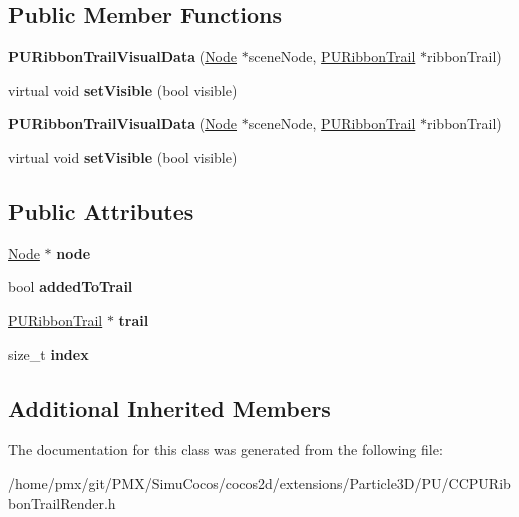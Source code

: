 \subsection*{Public Member Functions}
\begin{DoxyCompactItemize}
\item 
\mbox{\label{classPURibbonTrailVisualData_af4a8bd2be2968bc0cba828350ffb73f1}} 
{\bfseries P\+U\+Ribbon\+Trail\+Visual\+Data} (\hyperlink{classNode}{Node} $\ast$scene\+Node, \hyperlink{classPURibbonTrail}{P\+U\+Ribbon\+Trail} $\ast$ribbon\+Trail)
\item 
\mbox{\label{classPURibbonTrailVisualData_ace701631c7441bd764ae84b457c73a03}} 
virtual void {\bfseries set\+Visible} (bool visible)
\item 
\mbox{\label{classPURibbonTrailVisualData_af4a8bd2be2968bc0cba828350ffb73f1}} 
{\bfseries P\+U\+Ribbon\+Trail\+Visual\+Data} (\hyperlink{classNode}{Node} $\ast$scene\+Node, \hyperlink{classPURibbonTrail}{P\+U\+Ribbon\+Trail} $\ast$ribbon\+Trail)
\item 
\mbox{\label{classPURibbonTrailVisualData_ace701631c7441bd764ae84b457c73a03}} 
virtual void {\bfseries set\+Visible} (bool visible)
\end{DoxyCompactItemize}
\subsection*{Public Attributes}
\begin{DoxyCompactItemize}
\item 
\mbox{\label{classPURibbonTrailVisualData_a9c34388cf672f054e02776b0adad462f}} 
\hyperlink{classNode}{Node} $\ast$ {\bfseries node}
\item 
\mbox{\label{classPURibbonTrailVisualData_a27e035f7408faeba8eb4a4e4a0bc09d3}} 
bool {\bfseries added\+To\+Trail}
\item 
\mbox{\label{classPURibbonTrailVisualData_a98007e818be4ca729e4b5307139b7606}} 
\hyperlink{classPURibbonTrail}{P\+U\+Ribbon\+Trail} $\ast$ {\bfseries trail}
\item 
\mbox{\label{classPURibbonTrailVisualData_a9333b8672db4d6b315997e6fec086abf}} 
size\+\_\+t {\bfseries index}
\end{DoxyCompactItemize}
\subsection*{Additional Inherited Members}


The documentation for this class was generated from the following file\+:\begin{DoxyCompactItemize}
\item 
/home/pmx/git/\+P\+M\+X/\+Simu\+Cocos/cocos2d/extensions/\+Particle3\+D/\+P\+U/C\+C\+P\+U\+Ribbon\+Trail\+Render.\+h\end{DoxyCompactItemize}

